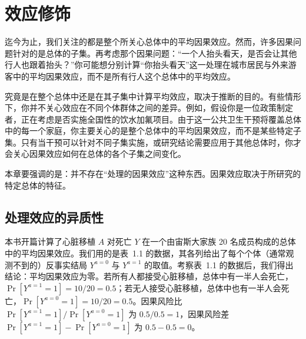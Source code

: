 \chapter{效应修饰}

迄今为止，我们关注的都是整个所关心总体中的平均因果效应。然而，许多因果问题针对的是总体的子集。再考虑那个因果问题：“一个人抬头看天，是否会让其他行人也跟着抬头？”你可能想分别计算“你抬头看天”这一处理在城市居民与外来游客中的平均因果效应，而不是所有行人这个总体中的平均效应。

究竟是在整个总体中还是在其子集中计算平均效应，取决于推断的目的。有些情形下，你并不关心效应在不同个体群体之间的差异。例如，假设你是一位政策制定者，正在考虑是否实施全国性的饮水加氟项目。由于这一公共卫生干预将覆盖总体中的每一个家庭，你主要关心的是整个总体中的平均因果效应，而不是某些特定子集。只有当干预可以针对不同子集实施，或研究结论需要应用于其他总体时，你才会关心因果效应如何在总体的各个子集之间变化。

本章要强调的是：并不存在“处理的因果效应”这种东西。因果效应取决于所研究的特定总体的特征。

\section{处理效应的异质性}

本书开篇计算了心脏移植 $A$ 对死亡 $Y$ 在一个由宙斯大家族 20 名成员构成的总体中的平均因果效应。我们用的是表~1.1 的数据，其各列给出了每个个体（通常观测不到的）反事实结局 $Y^{a=0}$ 与 $Y^{a=1}$ 的取值。考察表~1.1 的数据后，我们得出结论：平均因果效应为零。若所有人都接受心脏移植，总体中有一半人会死亡，$\Pr[Y^{a=1}=1]=10/20=0.5$；若无人接受心脏移植，总体中也有一半人会死亡，$\Pr[Y^{a=0}=1]=10/20=0.5$。因果风险比 $\Pr[Y^{a=1}=1]/\Pr[Y^{a=0}=1]$ 为 $0.5/0.5=1$，因果风险差 $\Pr[Y^{a=1}=1]-\Pr[Y^{a=0}=1]$ 为 $0.5-0.5=0$。

